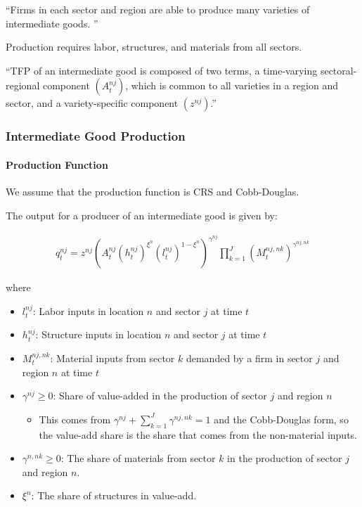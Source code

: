 \documentclass[10pt]{article}
\begin{document}
``Firms in each sector and region 
are able to produce many varieties
of intermediate goods. ''

Production requires 
labor, structures, and materials from all sectors.

``TFP of an intermediate good is composed of two terms, 
a time-varying sectoral-regional component $\left(A_t^{n j}\right)$, 
which is common to all varieties in a region and sector, and a 
variety-specific component $\left(z^{n j}\right)$.''


\subsubsection{Intermediate Good Production}

\paragraph{Production Function}

We assume that the production function is CRS and Cobb-Douglas.

The output for a producer of an intermediate good is given by:

\begin{align}
    q_t^{n j}=z^{n j}\left(A_t^{n j}\left(h_t^{n j}\right)^{\xi^n}\left(l_t^{n j}\right)^{1-\xi^n}\right)^{\gamma^{n j}} \prod_{k=1}^J\left(M_t^{n j, n k}\right)^{\gamma^{n j, n k}}
\end{align}

where

\begin{itemize}
    \item $l_t^{n j}$: Labor inputs in location $n$ and sector $j$ at time $t$
    \item $h_t^{n j}$: Structure inputs in location $n$ and sector $j$ at time $t$
    \item $M_t^{n j, n k}$: Material 
        inputs from sector $k$ demanded by a firm in sector $j$ and region $n$ at time $t$
    \item $\gamma^{n j} \geq 0$: Share of value-added in 
        the production of sector $j$ and region $n$
        \begin{itemize}
            \item This comes from $\gamma^{n j} + \sum_{k=1}^J \gamma^{n j, n k}=1$ and the Cobb-Douglas form, 
                so the value-add share is the share that comes from 
                the non-material inputs.
        \end{itemize}
    \item $\gamma^{n, n k} \geq 0$: The share of materials from sector $k$ in 
        the production of sector $j$ and region $n$.
    \item $\xi^n$: The share of structures in value-add.
\end{itemize}
\end{document}
